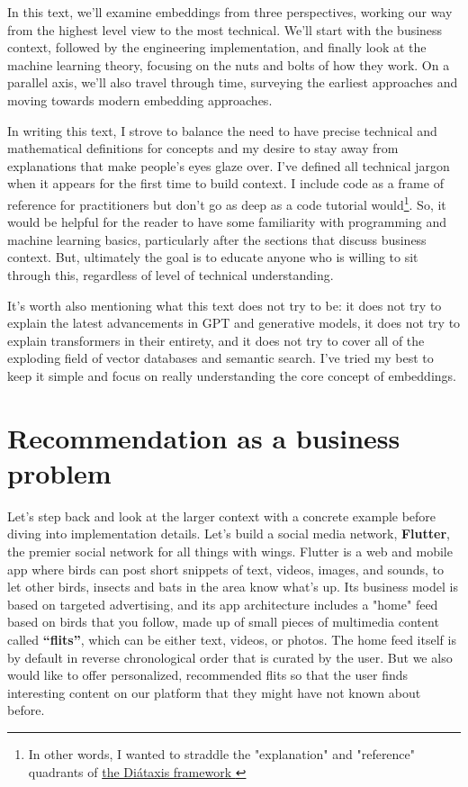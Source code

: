 \documentclass[11pt, table]{diazessay} %
\begin{document}
\begin{sloppypar}
In this text, we'll examine embeddings from three perspectives, working our way from the highest level view to the most technical. We'll start with the business context, followed by the engineering implementation, and finally look at the machine learning theory, focusing on the nuts and bolts of how they work. On a parallel axis, we'll also travel through time, surveying the earliest approaches and moving towards modern embedding approaches.  

In writing this text, I strove to balance the need to have precise technical and mathematical definitions for concepts and my desire to stay away from explanations that make people's eyes glaze over.  I've defined all technical jargon when it appears for the first time to build context. I include code as a frame of reference for practitioners but don't go as deep as a code tutorial would\footnote{In other words, I wanted to straddle the "explanation" and "reference" quadrants of \href{https://diataxis.fr/}{the Diátaxis framework }}. So, it would be helpful for the reader to have some familiarity with programming and machine learning basics, particularly after the sections that discuss business context. But, ultimately the goal is to educate anyone who is willing to sit through this, regardless of level of technical understanding. 

It's worth also mentioning what this text does not try to be: it does not try to explain the latest advancements in GPT and generative models, it does not try to explain transformers in their entirety, and it does not try to cover all of the exploding field of vector databases and semantic search. I've tried my best to keep it simple and focus on really understanding the core concept of embeddings.

\section{Recommendation as a business problem}

Let's step back and look at the larger context with a concrete example before diving into implementation details.  Let's build a social media network, \textbf{Flutter}, the premier social network for all things with wings. Flutter is a web and mobile app where birds can post short snippets of text, videos, images, and sounds, to let other birds, insects and bats in the area know what’s up. Its business model is based on targeted advertising, and its app architecture includes a "home" feed based on birds that you follow, made up of small pieces of multimedia content called \textbf{“flits”}, which can be either text, videos, or photos. The home feed itself is by default in reverse chronological order that is curated by the user. But we also would like to offer personalized, recommended flits so that the user finds interesting content on our platform that they might have not known about before.  


\end{sloppypar}
\end{document}
